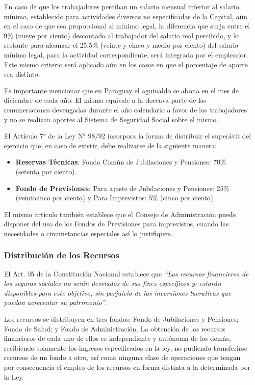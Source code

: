 En caso de que los trabajadores perciban un salario mensual inferior al salario mínimo, establecido para actividades diversas no especificadas de la Capital, aún en el caso de que sea proporcional al mínimo legal, la diferencia que surja entre el 9\% (nueve por ciento) descontado al trabajador del salario real percibido, y lo restante para alcanzar el 25,5\% (veinte y cinco y medio por ciento) del salario mínimo legal, para la actividad correspondiente, será integrada por el empleador. Este mismo criterio será aplicado aún en los casos en que el porcentaje de aporte sea distinto.

Es importante mencionar que en Paraguay el aguinaldo se abona en el mes de diciembre de cada año. El mismo equivale a la doceava parte de las remuneraciones devengadas durante el año calendario a favor de los trabajadores y no se realizan aportes al Sistema de Seguridad Social sobre el mismo.

El Artículo 7° de la Ley N° 98/92 incorpora la forma de distribuir el superávit del ejercicio que, en caso de existir, debe realizarse de la siguiente manera: 

\begin {itemize}

\item\textbf{Reservas Técnicas}: Fondo Común de Jubilaciones y Pensiones: 70\% (setenta por ciento).

\item\textbf{Fondo de Previsiones}: Para ajuste de Jubilaciones y Pensiones: 25\% (veinticinco por ciento) y 	Para Imprevistos: 5\% (cinco por ciento). 

\end{itemize}

El mismo artículo también establece que el Consejo de Administración puede disponer del uso de los Fondos de Previsiones para imprevistos, cuando las necesidades o circunstancias especiales así lo justifiquen. 

\subsubsection{Distribución de los Recursos}

El Art. 95 de la Constitución Nacional establece que \textit{“Los recursos financieros de los seguros sociales no serán desviados de sus fines específicos y; estarán disponibles para este objetivo, sin perjuicio de las inversiones lucrativas que puedan acrecentar su patrimonio”}.

Los recursos se distribuyen en tres fondos: Fondo de Jubilaciones y Pensiones; Fondo de Salud; y Fondo de Administración.  La obtención de los recursos financieros de cada uno de ellos es independiente y autónoma de los demás, recibiendo solamente los ingresos especificados en la ley, no pudiendo transferirse recursos de un fondo a otro, así como ninguna clase de operaciones que tengan por consecuencia el empleo de los recursos en forma distinta a la determinada por la Ley.

